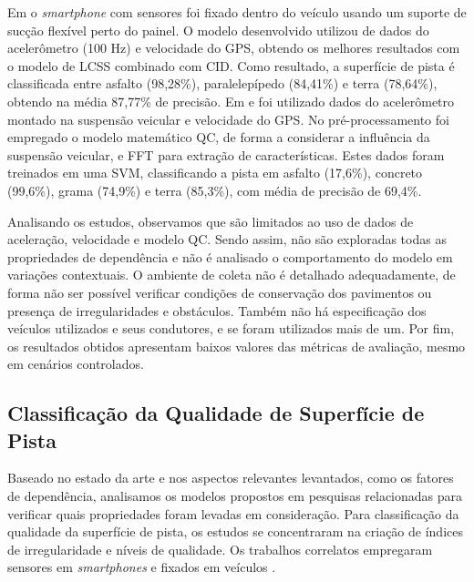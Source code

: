 Em  o \textit{smartphone} com sensores foi fixado dentro do veículo usando um suporte de sucção flexível perto do painel. O modelo desenvolvido utilizou de dados do acelerômetro (100 Hz) e velocidade do GPS, obtendo os melhores resultados com o modelo de LCSS combinado com CID. Como resultado, a superfície de pista é classificada entre asfalto (98,28\%), paralelepípedo (84,41\%) e terra (78,64\%), obtendo na média 87,77\% de precisão. Em   e  foi utilizado dados do acelerômetro montado na suspensão veicular e velocidade do GPS. No pré-processamento foi empregado o modelo matemático QC, de forma a considerar a influência da suspensão veicular, e FFT para extração de características. Estes dados foram treinados em uma SVM, classificando a pista em asfalto (17,6\%), concreto (99,6\%), grama (74,9\%) e terra (85,3\%), com média de precisão de 69,4\%. 

Analisando os estudos, observamos que são limitados ao uso de dados de aceleração, velocidade e modelo QC. Sendo assim, não são exploradas todas as propriedades de dependência e não é analisado o comportamento do modelo em variações contextuais. O ambiente de coleta não é detalhado adequadamente, de forma não ser possível verificar condições de conservação dos pavimentos ou presença de irregularidades e obstáculos. Também não há especificação dos veículos utilizados e seus condutores, e se foram utilizados mais de um. Por fim, os resultados obtidos apresentam baixos valores das métricas de avaliação, mesmo em cenários controlados.

\subsection{Classificação da Qualidade de Superfície de Pista}

Baseado no estado da arte e nos aspectos relevantes levantados, como os fatores de dependência, analisamos os modelos propostos em pesquisas relacionadas para verificar quais propriedades foram levadas em consideração. Para classificação da qualidade da superfície de pista, os estudos se concentraram na criação de índices de irregularidade e níveis de qualidade. Os trabalhos correlatos empregaram sensores em \textit{smartphones} \cite{Douangphachanh2014_1,Lima2016,Brunauer2016,Zhao2016,Allouch2017,Souza2018_1,Li2018,Nunes2019,Tiwari2020,Badurowicz2020,AbdelRaheem2020} e fixados em veículos \cite{Chen2013, Chen2016,Pitonak2016,Prapulla2017,Pont2017,Lei2018,Hassan2019,AbdelRaheem2020,Monica2021}.

